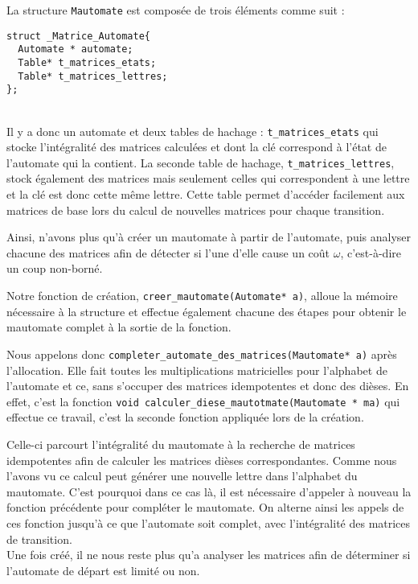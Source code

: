 \documentclass[12pt]{memoir}
\begin{document}
La structure \verb?Mautomate? est composée de trois éléments comme suit :

\begin{lstlisting}[frame=single]
struct _Matrice_Automate{
  Automate * automate;
  Table* t_matrices_etats;
  Table* t_matrices_lettres;
};
\end{lstlisting}
$ $\\\\

Il y a donc un automate et deux tables de hachage : \verb?t_matrices_etats? qui
stocke l'intégralité des matrices calculées et dont la clé correspond à l'état
de l'automate qui la contient. La seconde table de hachage, \verb?t_matrices_lettres?, stock également des matrices mais seulement celles qui correspondent à une lettre et la clé est donc cette même lettre. Cette table permet d’accéder facilement aux matrices de base lors du calcul de nouvelles matrices pour chaque transition.

\medskip
Ainsi, n'avons plus qu'à créer un mautomate à partir de l'automate, puis analyser chacune des matrices afin de détecter si l'une d'elle cause un coût $\omega$, c'est-à-dire un coup non-borné.

\bigskip
Notre fonction de création, \verb?creer_mautomate(Automate* a)?, alloue la
mémoire nécessaire à la structure et effectue également chacune des étapes
pour obtenir le mautomate complet à la sortie de la fonction.


Nous appelons donc \verb?completer_automate_des_matrices(Mautomate* a)? après
l'allocation. Elle fait toutes les multiplications matricielles pour
l'alphabet de l'automate et ce, sans s'occuper des matrices idempotentes et
donc des dièses. En effet, c'est la fonction \verb?void calculer_diese_mautotmate(Mautomate * ma)? qui effectue ce travail, c'est la
seconde fonction appliquée lors de la création.


Celle-ci parcourt l'intégralité du mautomate à la recherche de matrices
idempotentes afin de calculer les matrices dièses correspondantes. Comme nous
l'avons vu ce calcul peut générer une nouvelle lettre dans l'alphabet du
mautomate. C'est pourquoi dans ce cas là, il est nécessaire d'appeler à nouveau la fonction précédente pour compléter le mautomate. On alterne ainsi les appels de ces fonction jusqu'à ce que l'automate soit complet, avec l'intégralité des matrices de transition.\\

Une fois créé, il ne nous reste plus qu'a analyser les matrices afin de déterminer si l'automate de départ est limité ou non.\\
\end{document}
